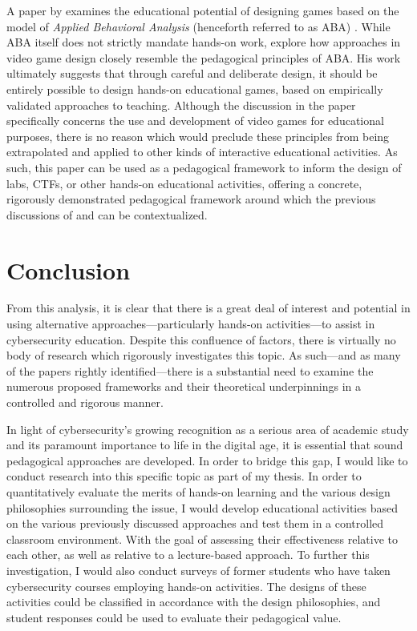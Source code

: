     A paper by \citeauthor{C-Linehan} examines the educational potential of designing games based on the model of \emph{Applied Behavioral Analysis} (henceforth referred to as ABA) \cite{C-Linehan}. While ABA itself does not strictly mandate hands-on work, \citeauthor{C-Linehan} explore how approaches in video game design closely resemble the pedagogical principles of ABA. His work ultimately suggests that through careful and deliberate design, it should be entirely possible to design hands-on educational games, based on empirically validated approaches to teaching. Although the discussion in the paper specifically concerns the use and development of video games for educational purposes, there is no reason which would preclude these principles from being extrapolated and applied to other kinds of interactive educational activities. As such, this paper can be used as a pedagogical framework to inform the design of labs, CTFs, or other hands-on educational activities, offering a concrete, rigorously demonstrated pedagogical framework around which the previous discussions of \citeauthor{J-Sweller} and \citeauthor{R-Weiss} can be contextualized. 


\section{Conclusion}

    From this analysis, it is clear that there is a great deal of interest and potential in using alternative approaches---particularly hands-on activities---to assist in cybersecurity education. Despite this confluence of factors, there is virtually no body of research which rigorously investigates this topic. As such---and as many of the papers rightly identified---there is a substantial need to examine the numerous proposed frameworks and their theoretical underpinnings in a controlled and rigorous manner. 

    In light of cybersecurity's growing recognition as a serious area of academic study and its paramount importance to life in the digital age, it is essential that sound pedagogical approaches are developed. In order to bridge this gap, I would like to conduct research into this specific topic as part of my thesis. In order to quantitatively evaluate the merits of hands-on learning and the various design philosophies surrounding the issue, I would develop educational activities based on the various previously discussed approaches and test them in a controlled classroom environment. With the goal of assessing their effectiveness relative to each other, as well as relative to a lecture-based approach. To further this investigation, I would also conduct surveys of former students who have taken cybersecurity courses employing hands-on activities. The designs of these activities could be classified in accordance with the design philosophies, and student responses could be used to evaluate their pedagogical value. 